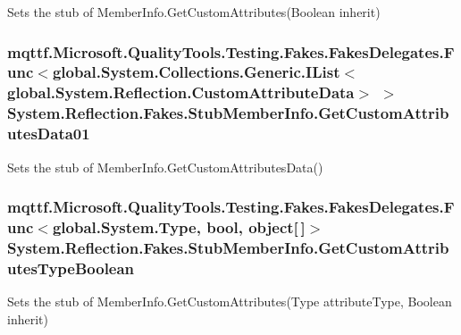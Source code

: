 Sets the stub of Member\-Info.\-Get\-Custom\-Attributes(\-Boolean inherit)

\hypertarget{class_system_1_1_reflection_1_1_fakes_1_1_stub_member_info_ae88e400fdc980fbcd15c76329751cc24}{
\subsubsection[{Get\-Custom\-Attributes\-Data01}]{\setlength{\rightskip}{0pt plus 5cm}mqttf.\-Microsoft.\-Quality\-Tools.\-Testing.\-Fakes.\-Fakes\-Delegates.\-Func$<$global.\-System.\-Collections.\-Generic.\-I\-List$<$global.\-System.\-Reflection.\-Custom\-Attribute\-Data$>$ $>$ System.\-Reflection.\-Fakes.\-Stub\-Member\-Info.\-Get\-Custom\-Attributes\-Data01}}\label{class_system_1_1_reflection_1_1_fakes_1_1_stub_member_info_ae88e400fdc980fbcd15c76329751cc24}


Sets the stub of Member\-Info.\-Get\-Custom\-Attributes\-Data()

\hypertarget{class_system_1_1_reflection_1_1_fakes_1_1_stub_member_info_a1a4d1051c916a9217657e1403ff891bc}{
\subsubsection[{Get\-Custom\-Attributes\-Type\-Boolean}]{\setlength{\rightskip}{0pt plus 5cm}mqttf.\-Microsoft.\-Quality\-Tools.\-Testing.\-Fakes.\-Fakes\-Delegates.\-Func$<$global.\-System.\-Type, bool, object\mbox{[}$\,$\mbox{]}$>$ System.\-Reflection.\-Fakes.\-Stub\-Member\-Info.\-Get\-Custom\-Attributes\-Type\-Boolean}}\label{class_system_1_1_reflection_1_1_fakes_1_1_stub_member_info_a1a4d1051c916a9217657e1403ff891bc}


Sets the stub of Member\-Info.\-Get\-Custom\-Attributes(\-Type attribute\-Type, Boolean inherit)

